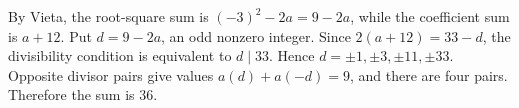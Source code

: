 By Vieta, the root-square sum is $(-3)^2-2a=9-2a$, while the coefficient sum is $a+12$. Put $d=9-2a$, an odd nonzero integer. Since $2(a+12)=33-d$, the divisibility condition is equivalent to $d\mid33$. Hence $d=\pm1,\pm3,\pm11,\pm33$. Opposite divisor pairs give values $a(d)+a(-d)=9$, and there are four pairs. Therefore the sum is $\boxed{36}$.
